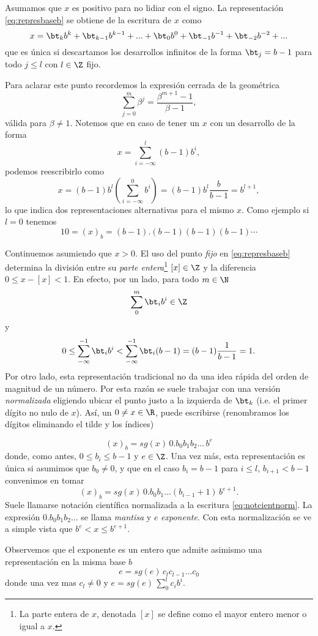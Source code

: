 Asumamos que $x$ es positivo para no lidiar con el signo. La representación \eqref{eq:represbaseb} se obtiene de la escritura de $x$ como
$$
x=\bt_kb^k+\bt_{k-1}b^{k-1}+...+\bt_0b^0+\bt_{-1}b^{-1}+\bt_{-2}b^{-2}+...
$$
 que es única si  descartamos los desarrollos infinitos de la forma $\bt_j=b-1$ para todo $j\le l$ con $l\in \Z$ fijo.

 Para aclarar este punto recordemos la expresión  cerrada de la geométrica
$$
\sum_{j=0}^m\beta^j=\frac{\beta^{m+1}-1}{\beta -1},
$$
 válida para $\beta\neq 1$. Notemos que  en caso de tener un $x$ con un desarrollo de la forma
$$
x=\sum_{i=-\infty}^l(b-1)b^i,
$$
podemos reescribirlo como
$$
x=(b-1)b^{l}
\left(\sum_{i=-\infty}^0b^i\right)=(b-1)b^l\frac{b}{b-1}=b^{l+1},
$$
lo que indica dos  representaciones alternativas para el mismo $x$. Como ejemplo si  $l=0$ tenemos
$$
10=(x)_b=(b-1).(b-1)(b-1)(b-1)\cdots
$$

Continuemos asumiendo que $x>0$. El uso del punto \emph{fijo} en  \eqref{eq:represbaseb}  determina la división entre su \emph{parte entera}\footnote{La parte entera de $x$, denotada $[x]$ se define como el mayor entero menor o igual a $x$.}  $[x]\in \Z$ y la diferencia $0\le x-[x]<1$. En efecto, por un lado, para todo $m\in \N$
$$\sum_{0}^m\bt_i b^i\in \Z$$
y
$$
0\le \sum_{-\infty}^{-1}\bt_ib^{i}<\sum_{-\infty}^{-1}\bt_i(b-1)=(b-1)\frac{1}{b-1}=1.
$$
Por otro lado, esta representación tradicional no da una idea rápida del orden de magnitud
de un número. Por esta razón se suele trabajar con una versión \emph{normalizada}  eligiendo ubicar el punto justo a la izquierda de $\bt_k$ (i.e. el primer dígito no nulo de $x$). Así, un $0\neq x\in \R$, puede escribirse (renombramos los dígitos eliminando el tilde y los índices)

\begin{equation}
 \label{eq:notcientnorm}
(x)_b=sg(x) \, 0.b_0b_1b_2...\, b^{e}
\end{equation}
donde, como antes, $0\le b_i\le b-1$ y $e\in \Z$.
Una vez más, esta representación es única si asumimos que $b_0\neq 0$, y que en el caso $b_i=b-1$ para $i\le l$, $b_{i+1}<b-1$
convenimos en tomar
$$
(x)_b=sg(x)\, 0.b_0b_1...(b_{i-1}+1)\, b^{e+1}.
$$
Suele llamarse notación científica normalizada a la escritura \eqref{eq:notcientnorm}. La expresión  $0.b_0b_1b_2...$ se llama \emph{mantisa} y $e$  \emph{exponente}. Con esta normalización se ve a simple vista que $b^e< x\le b^{e+1}$.

Observemos que el exponente es un entero que admite asimismo una representación en la misma base $b$
$$e=sg(e)\, c_lc_{l-1}...c_{0}$$
donde una vez mas $c_l\neq 0$ y
$e=sg(e)\, \sum_0^{l}c_ib^i$.
